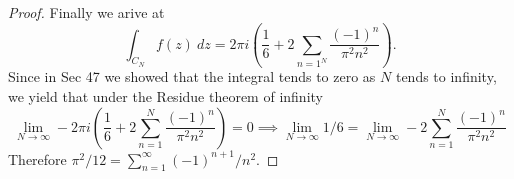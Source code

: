 \documentclass[11pt]{amsart}
\theoremstyle{definition}
\numberwithin{theorem}{section}
\numberwithin{definition}{section}
\numberwithin{equation}{section}
\newcommand{\parens}[1]{ \left( #1 \right) }
\begin{document}
\begin{proof}
	Finally we arive at
	\begin{equation*}
		\int_{C_N} f(z)\ dz = 2\pi i\parens{\frac{1}{6} + 2\sum_{n=1^N} \frac{(-1)^n}{\pi^2 n^2 } }.
	\end{equation*}
	Since in Sec 47 we showed that the integral tends to zero as $N$ tends to infinity, we yield that under the Residue theorem of infinity 
	\begin{equation*}
		 \lim_{N\to \infty} -2\pi i\parens{\frac{1}{6} + 2\sum_{n=1}^N \frac{(-1)^n}{\pi^2 n^2 } }= 0 \implies \lim_{N\to \infty} 1/6 = \lim_{N\to \infty} - 2\sum_{n=1}^N \frac{(-1)^n}{\pi^2 n^2 } 
	\end{equation*}
	Therefore $\pi^2/12 = \sum_{n=1}^\infty (-1)^{n+1}/n^2.$
	\end{proof}
\end{document}
